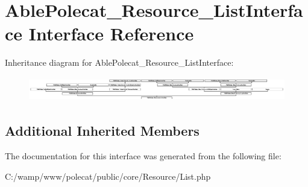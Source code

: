 \hypertarget{interface_able_polecat___resource___list_interface}{}\section{Able\+Polecat\+\_\+\+Resource\+\_\+\+List\+Interface Interface Reference}
\label{interface_able_polecat___resource___list_interface}
Inheritance diagram for Able\+Polecat\+\_\+\+Resource\+\_\+\+List\+Interface\+:\begin{figure}[H]
\begin{center}
\leavevmode
\includegraphics[height=1.067073cm]{interface_able_polecat___resource___list_interface}
\end{center}
\end{figure}
\subsection*{Additional Inherited Members}


The documentation for this interface was generated from the following file\+:\begin{DoxyCompactItemize}
\item 
C\+:/wamp/www/polecat/public/core/\+Resource/List.\+php\end{DoxyCompactItemize}
